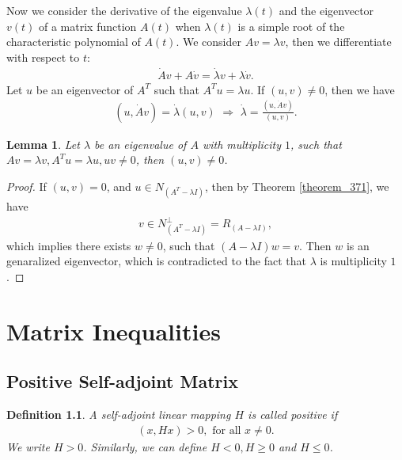 \documentclass[11pt]{book}
\newtheorem{definition}{Definition}[chapter]
\newtheorem{lemma}[theorem]{Lemma}
\theoremstyle{definition}
\numberwithin{equation}{chapter}
\begin{document}
Now we consider the derivative of the eigenvalue $\lambda(t)$ and the eigenvector $v(t)$ of a matrix function $A(t)$ when $\lambda(t)$ is a simple root of the characteristic polynomial of $A(t)$. We consider $Av = \lambda v$, then we differentiate with respect to $t$:
\begin{align*}
    \dot{A}v + A\dot{v} = \dot{\lambda}v + \lambda \dot{v}.
\end{align*}
Let $u$ be an eigenvector of $A^T$ such that $A^T u = \lambda u$. If $(u,v)\neq 0$, then we have
\begin{align*}
    (u,\dot{A}v) = \dot{\lambda} (u,v)\,\, \Rightarrow \,\, \dot{\lambda} = \frac{(u,\dot{A}v)}{(u,v)}.
\end{align*}

\begin{lemma}
Let $\lambda$ be an eigenvalue of $A$ with multiplicity $1$, such that $Av = \lambda v, A^Tu = \lambda u, uv \neq 0$, then $(u,v)\neq 0$.
\end{lemma}
\begin{proof}
If $(u,v) = 0$, and $u\in N_{\left(A^T - \lambda I\right)}$, then by Theorem \ref{theorem_371}, we have 
\begin{align*}
    v \in N_{\left(A^T - \lambda I\right)}^\perp = R_{\left(A - \lambda I\right)},
\end{align*}
which implies there exists $w\neq 0$, such that $(A - \lambda I)w = v$. Then $w$ is an genaralized eigenvector, which is contradicted to the fact that $\lambda$ is multiplicity $1$.
\end{proof}

\medskip


\chapter{Matrix Inequalities}\label{matrix_inequalities}

\section{Positive Self-adjoint Matrix}

\begin{definition}
A self-adjoint linear mapping $H$ is called positive if 
\begin{align*}
    (x, Hx) > 0,\,\, \text{for all} \,\, x \neq 0.
\end{align*}
We write $H > 0$. Similarly, we can define $H < 0, H \geq 0$ and $H \leq 0$.
\end{definition}
\end{document}
